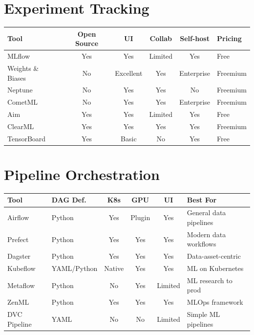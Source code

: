 \section{Experiment Tracking}
\label{app:tracking-tools}

\begin{center}
\begin{tabular}{@{}lccccl@{}}
\toprule
\textbf{Tool} & \textbf{Open Source} & \textbf{UI} &
  \textbf{Collab} & \textbf{Self-host} & \textbf{Pricing} \\
\midrule
MLflow & Yes & Yes & Limited & Yes & Free \\
Weights \& Biases & No & Excellent & Yes & Enterprise & Freemium \\
Neptune & No & Yes & Yes & No & Freemium \\
CometML & No & Yes & Yes & Enterprise & Freemium \\
Aim & Yes & Yes & Limited & Yes & Free \\
ClearML & Yes & Yes & Yes & Yes & Freemium \\
TensorBoard & Yes & Basic & No & Yes & Free \\
\bottomrule
\end{tabular}
\end{center}

\section{Pipeline Orchestration}
\label{app:orchestration-tools}

\begin{center}
\begin{tabular}{@{}llcccp{3.5cm}@{}}
\toprule
\textbf{Tool} & \textbf{DAG Def.} & \textbf{K8s} &
  \textbf{GPU} & \textbf{UI} & \textbf{Best For} \\
\midrule
Airflow & Python & Yes & Plugin & Yes & General data pipelines \\
Prefect & Python & Yes & Yes & Yes & Modern data workflows \\
Dagster & Python & Yes & Yes & Yes & Data-asset-centric \\
Kubeflow & YAML/Python & Native & Yes & Yes & ML on Kubernetes \\
Metaflow & Python & No & Yes & Limited & ML research to prod \\
ZenML & Python & Yes & Yes & Yes & MLOps framework \\
DVC Pipeline & YAML & No & No & Limited & Simple ML pipelines \\
\bottomrule
\end{tabular}
\end{center}


